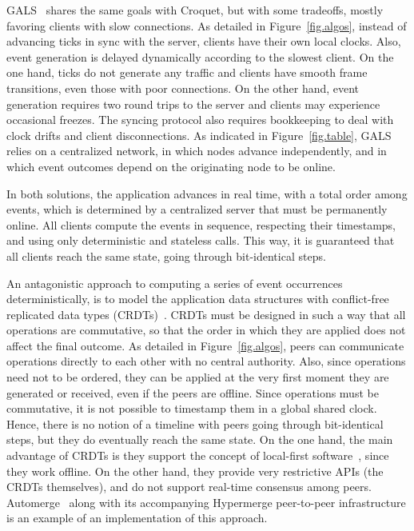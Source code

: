 \documentclass[10pt,journal,compsoc]{IEEEtran}
\begin{document}
GALS~\cite{TODO} shares the same goals with Croquet, but with some tradeoffs,
mostly favoring clients with slow connections.
As detailed in Figure~\ref{fig.algos}, instead of advancing ticks in sync with
the server, clients have their own local clocks.
Also, event generation is delayed dynamically according to the slowest client.
%
On the one hand, ticks do not generate any traffic and clients have smooth
frame transitions, even those with poor connections.
On the other hand, event generation requires two round trips to the server and
clients may experience occasional freezes.
The syncing protocol also requires bookkeeping to deal with clock drifts and
client disconnections.
%
As indicated in Figure~\ref{fig.table}, GALS relies on a centralized
network, in which nodes advance independently, and in which event outcomes
depend on the originating node to be online.

In both solutions, the application advances in real time, with a total order
among events, which is determined by a centralized server that must be
permanently online.
All clients compute the events in sequence, respecting their timestamps, and
using only deterministic and stateless calls.
This way, it is guaranteed that all clients reach the same state, going
through bit-identical steps.

An antagonistic approach to computing a series of event occurrences
deterministically, is to model the application data structures with
conflict-free replicated data types (CRDTs)~\cite{TODO}.
CRDTs must be designed in such a way that all operations are commutative, so
that the order in which they are applied does not affect the final outcome.
%
As detailed in Figure~\ref{fig.algos}, peers can communicate operations
directly to each other with no central authority.
Also, since operations need not to be ordered, they can be applied at the
very first moment they are generated or received, even if the peers are
offline.
%
Since operations must be commutative, it is not possible to timestamp them
in a global shared clock.
Hence, there is no notion of a timeline with peers going through bit-identical
steps, but they do eventually reach the same state.
%
On the one hand, the main advantage of CRDTs is they support the concept of
local-first software~\cite{TODO}, since they work offline.
On the other hand, they provide very restrictive APIs (the CRDTs themselves),
and do not support real-time consensus among peers.
%
Automerge~\cite{TODO} along with its accompanying Hypermerge peer-to-peer
infrastructure is an example of an implementation of this approach.
\end{document}
